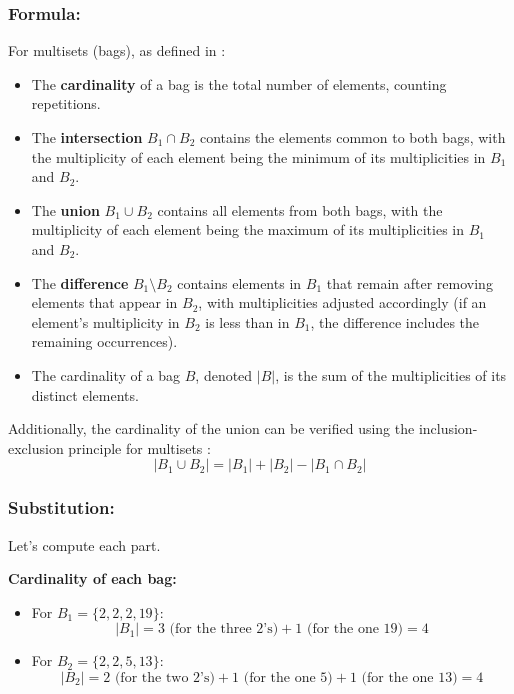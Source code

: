 \documentclass[12pt, a4paper, twoside]{report} %
\begin{document}
\subsubsection*{Formula:}
For multisets (bags), as defined in \cite{epp2020}:
\begin{itemize}
  \item The \textbf{cardinality} of a bag is the total number of elements, counting repetitions.
  \item The \textbf{intersection} \( B_1 \cap B_2 \) contains the elements common to both bags, with the multiplicity of each element being the minimum of its multiplicities in \( B_1 \) and \( B_2 \).
  \item The \textbf{union} \( B_1 \cup B_2 \) contains all elements from both bags, with the multiplicity of each element being the maximum of its multiplicities in \( B_1 \) and \( B_2 \).
  \item The \textbf{difference} \( B_1 \setminus B_2 \) contains elements in \( B_1 \) that remain after removing elements that appear in \( B_2 \), with multiplicities adjusted accordingly (if an element’s multiplicity in \( B_2 \) is less than in \( B_1 \), the difference includes the remaining occurrences).
  \item The cardinality of a bag \( B \), denoted \( |B| \), is the sum of the multiplicities of its distinct elements.
\end{itemize}
Additionally, the cardinality of the union can be verified using the inclusion-exclusion principle for multisets \cite{rosen2019}:
\[
|B_1 \cup B_2| = |B_1| + |B_2| - |B_1 \cap B_2|
\]

\subsubsection*{Substitution:}
Let’s compute each part.

\textbf{Cardinality of each bag:}
\begin{itemize}
  \item For \( B_1 = \{2, 2, 2, 19\} \):
    \[
    |B_1| = 3 \text{ (for the three 2’s)} + 1 \text{ (for the one 19)} = 4
    \]
  \item For \( B_2 = \{2, 2, 5, 13\} \):
    \[
    |B_2| = 2 \text{ (for the two 2’s)} + 1 \text{ (for the one 5)} + 1 \text{ (for the one 13)} = 4
    \]
\end{itemize}
\end{document}
